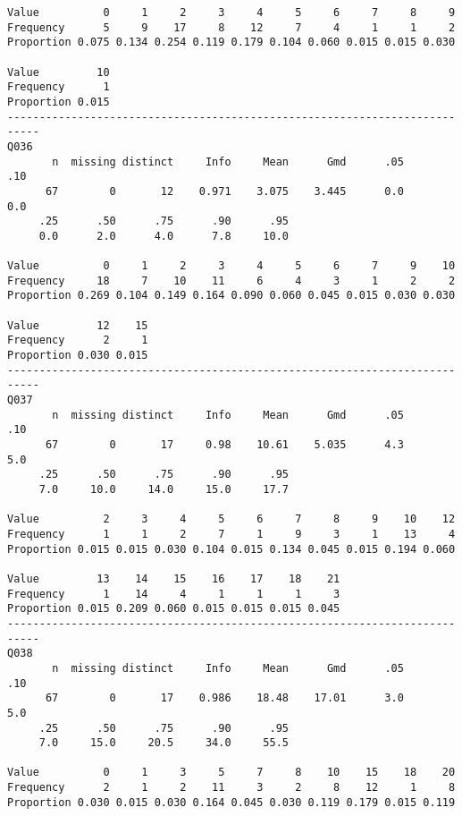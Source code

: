 \documentclass[]{article}
\begin{document}
\begin{verbatim}
Value          0     1     2     3     4     5     6     7     8     9
Frequency      5     9    17     8    12     7     4     1     1     2
Proportion 0.075 0.134 0.254 0.119 0.179 0.104 0.060 0.015 0.015 0.030
                
Value         10
Frequency      1
Proportion 0.015
---------------------------------------------------------------------------
Q036 
       n  missing distinct     Info     Mean      Gmd      .05      .10 
      67        0       12    0.971    3.075    3.445      0.0      0.0 
     .25      .50      .75      .90      .95 
     0.0      2.0      4.0      7.8     10.0 
                                                                      
Value          0     1     2     3     4     5     6     7     9    10
Frequency     18     7    10    11     6     4     3     1     2     2
Proportion 0.269 0.104 0.149 0.164 0.090 0.060 0.045 0.015 0.030 0.030
                      
Value         12    15
Frequency      2     1
Proportion 0.030 0.015
---------------------------------------------------------------------------
Q037 
       n  missing distinct     Info     Mean      Gmd      .05      .10 
      67        0       17     0.98    10.61    5.035      4.3      5.0 
     .25      .50      .75      .90      .95 
     7.0     10.0     14.0     15.0     17.7 
                                                                      
Value          2     3     4     5     6     7     8     9    10    12
Frequency      1     1     2     7     1     9     3     1    13     4
Proportion 0.015 0.015 0.030 0.104 0.015 0.134 0.045 0.015 0.194 0.060
                                                    
Value         13    14    15    16    17    18    21
Frequency      1    14     4     1     1     1     3
Proportion 0.015 0.209 0.060 0.015 0.015 0.015 0.045
---------------------------------------------------------------------------
Q038 
       n  missing distinct     Info     Mean      Gmd      .05      .10 
      67        0       17    0.986    18.48    17.01      3.0      5.0 
     .25      .50      .75      .90      .95 
     7.0     15.0     20.5     34.0     55.5 
                                                                      
Value          0     1     3     5     7     8    10    15    18    20
Frequency      2     1     2    11     3     2     8    12     1     8
Proportion 0.030 0.015 0.030 0.164 0.045 0.030 0.119 0.179 0.015 0.119
                                                    

\end{verbatim}
\end{document}
